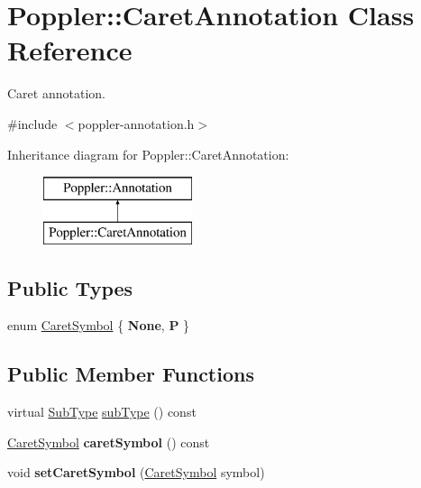 \hypertarget{class_poppler_1_1_caret_annotation}{}\section{Poppler\+:\+:Caret\+Annotation Class Reference}
\label{class_poppler_1_1_caret_annotation}


Caret annotation.  




{\ttfamily \#include $<$poppler-\/annotation.\+h$>$}

Inheritance diagram for Poppler\+:\+:Caret\+Annotation\+:\begin{figure}[H]
\begin{center}
\leavevmode
\includegraphics[height=2.000000cm]{class_poppler_1_1_caret_annotation}
\end{center}
\end{figure}
\subsection*{Public Types}
\begin{DoxyCompactItemize}
\item 
enum \hyperlink{class_poppler_1_1_caret_annotation_a391714f3129aad14eb4c2e4094f6410a}{Caret\+Symbol} \{ {\bfseries None}, 
{\bfseries P}
 \}
\end{DoxyCompactItemize}
\subsection*{Public Member Functions}
\begin{DoxyCompactItemize}
\item 
virtual \hyperlink{class_poppler_1_1_annotation_a2d592999c330949d64679cfa9e81113f}{Sub\+Type} \hyperlink{class_poppler_1_1_caret_annotation_a08a713ef697a4e318d20a1271d912b89}{sub\+Type} () const
\item 
\mbox{\label{class_poppler_1_1_caret_annotation_a8b50d6af9358373c35b65b23150c87d5}} 
\hyperlink{class_poppler_1_1_caret_annotation_a391714f3129aad14eb4c2e4094f6410a}{Caret\+Symbol} {\bfseries caret\+Symbol} () const
\item 
\mbox{\label{class_poppler_1_1_caret_annotation_ad0968455a87048e3181b60f4c7bbc9bc}} 
void {\bfseries set\+Caret\+Symbol} (\hyperlink{class_poppler_1_1_caret_annotation_a391714f3129aad14eb4c2e4094f6410a}{Caret\+Symbol} symbol)
\end{DoxyCompactItemize}
